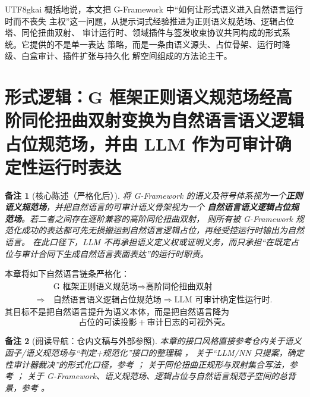 \documentclass[12pt]{article}
\newtheorem{remark}{备注}[section]
\newcommand{\GFramework}{\textsf{G-Framework}}
\begin{document}
\begin{CJK*}{UTF8}{gkai}
概括地说，本文把 \GFramework{} 中“如何让形式语义进入自然语言运行时而不丧失
主权”这一问题，从提示词式经验推进为正则语义规范场、逻辑占位塔、同伦扭曲双射、
审计运行时、领域插件与签发收束协议共同构成的形式系统。它提供的不是单一表达
策略，而是一条由语义源头、占位骨架、运行时降级、白盒审计、插件扩张与持久化
解空间组成的方法论主干。

\setcounter{tocdepth}{3}
\setcounter{secnumdepth}{3}
\tableofcontents
\clearpage

\section{形式逻辑：G 框架正则语义规范场经高阶同伦扭曲双射变换为自然语言语义逻辑占位规范场，并由 LLM 作为可审计确定性运行时表达}
\label{sec:tex37-ch1}

\begin{remark}[核心陈述（严格化后）]
将 \GFramework{} 的语义及符号体系视为一个\textbf{正则语义规范场}，并把自然语言的可审计语义骨架视为一个
\textbf{自然语言语义逻辑占位规范场}。若二者之间存在逐阶兼容的高阶同伦扭曲双射，
则所有被 \GFramework{} 规范化成功的表达都可先无损搬运到自然语言逻辑占位，再经受控运行时输出为自然语言。
在此口径下，LLM 不再承担语义定义权或证明义务，而只承担“在既定占位与审计合同下生成自然语言表面表达”的运行时职责。
\end{remark}

本章将如下自然语言链条严格化：
\[
  \begin{aligned}
    &\text{G 框架正则语义规范场}
    \Longrightarrow
    \text{高阶同伦扭曲双射}\\
    \Longrightarrow\ &
    \text{自然语言语义逻辑占位规范场}
    \Longrightarrow
    \text{LLM 可审计确定性运行时}.
  \end{aligned}
\]
其目标不是把自然语言提升为语义本体，而是把自然语言降为
\[
  \text{占位的可读投影}+\text{审计日志的可视外壳}。
\]

\begin{remark}[阅读导航：仓内文稿与外部参照]
本章的接口风格直接参考仓内关于语义函子/语义规范场与“判定+规范化”接口的整理稿 \cite{RepoTex20SemanticGaugeNormalization}，
关于“LLM/NN 只提案，确定性审计器裁决”的形式化口径，参考 \cite{RepoTex21AuditedWrapper,RepoTex23SemanticBase}；
关于同伦扭曲正规形与双射集合写法，参考 \cite{RepoTex36HomotopyTwistBijection}；
关于 \GFramework{}、语义规范场、逻辑占位与自然语言规范子空间的总背景，参考
\cite{GaoZhengAppVol2,GaoZhengAppVol3,GaoZheng2025GFramework}。


\end{remark}
\end{CJK*}
\end{document}
